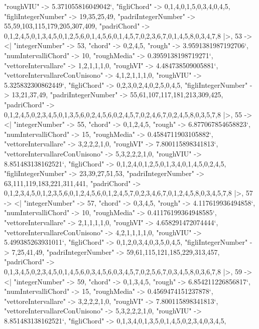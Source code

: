 \documentclass[
]{article}
\begin{document}
\begin{DatasetVerbatim}
    "roughVIU" -> 5.371055816049042`,
    "figliChord" -> {{0,1,4},{0,1,5},{0,3,4},{0,4,5}},
    "figliIntegerNumber" -> {19,35,25,49},
    "padriIntegerNumber" -> {55,59,103,115,179,205,307,409},
    "padriChord" -> {{0,1,2,4,5},{0,1,3,4,5},{0,1,2,5,6},{0,1,4,5,6},{0,1,4,5,7},{0,2,3,6,7},{0,1,4,5,8},{0,3,4,7,8}}
  |>,
  53 -> <|
    "integerNumber" -> 53,
    "chord" -> {0,2,4,5},
    "rough" -> 3.9591381987192706`,
    "numIntervalliChord" -> 10,
    "roughMedia" -> 0.3959138198719271`,
    "vettoreIntervallare" -> {1,2,1,1,1,0},
    "roughVI" -> 4.484738509005881`,
    "vettoreIntervallareConUnisono" -> {4,1,2,1,1,1,0},
    "roughVIU" -> 5.325832300862449`,
    "figliChord" -> {{0,2,3},{0,2,4},{0,2,5},{0,4,5}},
    "figliIntegerNumber" -> {13,21,37,49},
    "padriIntegerNumber" -> {55,61,107,117,181,213,309,425},
    "padriChord" -> {{0,1,2,4,5},{0,2,3,4,5},{0,1,3,5,6},{0,2,4,5,6},{0,2,4,5,7},{0,2,4,6,7},{0,2,4,5,8},{0,3,5,7,8}}
  |>,
  55 -> <|
    "integerNumber" -> 55,
    "chord" -> {0,1,2,4,5},
    "rough" -> 6.877067854658823`,
    "numIntervalliChord" -> 15,
    "roughMedia" -> 0.4584711903105882`,
    "vettoreIntervallare" -> {3,2,2,2,1,0},
    "roughVI" -> 7.800115898341813`,
    "vettoreIntervallareConUnisono" -> {5,3,2,2,2,1,0},
    "roughVIU" -> 8.851483138162521`,
    "figliChord" -> {{0,1,2,4},{0,1,2,5},{0,1,3,4},{0,1,4,5},{0,2,4,5}},
    "figliIntegerNumber" -> {23,39,27,51,53},
    "padriIntegerNumber" -> {63,111,119,183,221,311,441},
    "padriChord" -> {{0,1,2,3,4,5},{0,1,2,3,5,6},{0,1,2,4,5,6},{0,1,2,4,5,7},{0,2,3,4,6,7},{0,1,2,4,5,8},{0,3,4,5,7,8}}
  |>,
  57 -> <|
    "integerNumber" -> 57,
    "chord" -> {0,3,4,5},
    "rough" -> 4.117619936494858`,
    "numIntervalliChord" -> 10,
    "roughMedia" -> 0.41176199364948585`,
    "vettoreIntervallare" -> {2,1,1,1,1,0},
    "roughVI" -> 4.658291472074444`,
    "vettoreIntervallareConUnisono" -> {4,2,1,1,1,1,0},
    "roughVIU" -> 5.499385263931011`,
    "figliChord" -> {{0,1,2},{0,3,4},{0,3,5},{0,4,5}},
    "figliIntegerNumber" -> {7,25,41,49},
    "padriIntegerNumber" -> {59,61,115,121,185,229,313,457},
    "padriChord" -> {{0,1,3,4,5},{0,2,3,4,5},{0,1,4,5,6},{0,3,4,5,6},{0,3,4,5,7},{0,2,5,6,7},{0,3,4,5,8},{0,3,6,7,8}}
  |>,
  59 -> <|
    "integerNumber" -> 59,
    "chord" -> {0,1,3,4,5},
    "rough" -> 6.854211226856817`,
    "numIntervalliChord" -> 15,
    "roughMedia" -> 0.4569474151237878`,
    "vettoreIntervallare" -> {3,2,2,2,1,0},
    "roughVI" -> 7.800115898341813`,
    "vettoreIntervallareConUnisono" -> {5,3,2,2,2,1,0},
    "roughVIU" -> 8.851483138162521`,
    "figliChord" -> {{0,1,3,4},{0,1,3,5},{0,1,4,5},{0,2,3,4},{0,3,4,5}},

\end{DatasetVerbatim}
\end{document}
